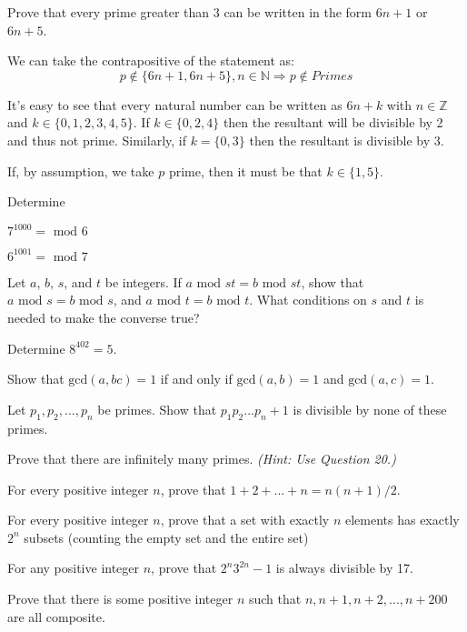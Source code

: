 \documentclass[11pt,largemargins]{homework}
\begin{document}
\question 
Prove that every prime greater than 3 can be written in the form $6n+1$ or $6n+5$.

\quad We can take the contrapositive of the statement as:
$$p \notin \{6n+1, 6n+5\}, n\in\mathbb{N} \Rightarrow p \notin Primes$$

\quad It's easy to see that every natural number can be written as $6n+k$ with $n \in \mathbb{Z}$ and 
$k \in \{0,1,2,3,4,5\}$. If $k\in\{0,2,4\}$ then the resultant will be divisible by 2 and thus not prime.
Similarly, if $k=\{0,3\}$ then the resultant is divisible by 3.

\quad If, by assumption, we take $p$ prime, then it must be that $k\in\{1,5\}$.

\question 
Determine 

\begin{alphaparts}
    \questionpart 
    $7^{1000} = \text{ mod }6$

    \questionpart 
    $6^{1001} = \text{ mod }7$
\end{alphaparts}

\question 
Let $a$, $b$, $s$, and $t$ be integers. If $a\text{ mod }st=b\text{ mod }st$, show that 
$a\text{ mod }s=b\text{ mod }s$, and $a\text{ mod }t=b\text{ mod }t$. What conditions on $s$ and $t$ 
is needed to make the converse true?

\question 
Determine $8^{402}=5$.

\question 
Show that $\text{gcd}(a,bc)=1$ if and only if $\text{gcd}(a,b)=1$ and $\text{gcd}(a,c)=1$.

\question 
Let $p_1,p_2,...,p_n$ be primes. Show that $p_1p_2...p_n+1$ is divisible by none of these primes.

\question 
Prove that there are infinitely many primes. \textit{(Hint: Use Question 20.)}

\question 
For every positive integer $n$, prove that $1+2+...+n=n(n+1)/2$.

\question 
For every positive integer $n$, prove that a set with exactly $n$ elements has exactly $2^n$ subsets (counting the empty 
set and the entire set)

\question 
For any positive integer $n$, prove that $2^n3^{2n}-1$ is always divisible by 17.

\question 
Prove that there is some positive integer $n$ such that $n, n+1, n+2,...,n+200$ are all composite.
\end{document}
